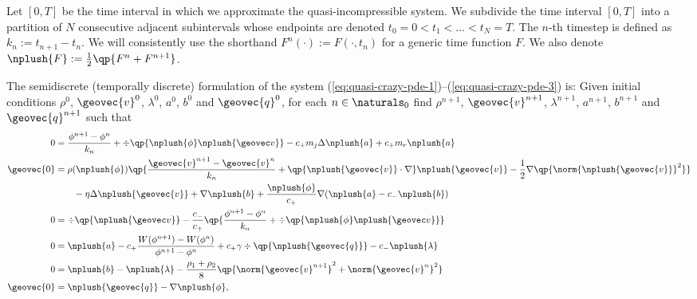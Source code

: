 \documentclass[final]{amsart}
\numberwithin{equation}{section}
\begin{document}
Let $[0,T]$ be the time interval in which we approximate the
quasi-incompressible system. We subdivide the time interval $[0,T]$
into a partition of $N$ consecutive adjacent subintervals whose
endpoints are denoted $t_0=0<t_1<\ldots<t_{N}=T$.  The $n$-th timestep
is defined as ${k_n := t_{n+1} - t_{n}}$.  We will consistently use
the shorthand $F^n(\cdot):=F(\cdot,t_n)$ for a generic time function
$F$. We also denote $\nplush{F} := \frac{1}{2}\qp{F^n + F^{n+1}}$.

The semidiscrete (temporally discrete) formulation of the system
(\ref{eq:quasi-crazy-pde-1})--(\ref{eq:quasi-crazy-pde-3}) is: Given
initial conditions $\rho^0$, ${\geovec{v}}^0$, $\lambda^0$, $a^0$, $b^0$ and
${\geovec{q}}^0$, for each
{$n\in\naturals_{0}$} find
$\rho^{n+1}$, ${\geovec{v}}^{n+1}$, $\lambda^{n+1}$, $a^{n+1}$, $b^{n+1}$
and ${\geovec{q}}^{n+1}$ such that
\begin{equation}
  \label{eq:temporally-discrete}
  \begin{split}
    0
    &= 
    \frac{\phi^{n+1} - \phi^n}{k_n} 
    +
    \div\qp{\nplush{\phi} \nplush{\geovec v}}
    -
    c_+ m_j \Delta \nplush{a}
    +
    c_+ m_r \nplush{a}
    \\
   {\geovec{0}} 
    &= 
    \rho(\nplush{\phi})
    \qp{
      \frac{{\geovec{{v}}}^{n+1} - {\geovec{{v}}}^n}{k_n}
      +
      \qp{\nplush{{\geovec{{v}}}}\cdot \nabla}\nplush{{\geovec{{v}}}}
      -
      \frac{1}{2}
      \nabla\qp{\norm{\nplush{{\geovec{{v}}}}}^2}
    }
    \\
    &\qquad - 
    \eta \Delta \nplush{\geovec{v}}
    +
    \nabla \nplush{b}
    +
    \frac{\nplush{\phi}}{c_+}\nabla( \nplush{a} - {c_-} \nplush{b})
    \\
    0 
    &= 
    \div\qp{\nplush{\geovec v}}
    -
    \frac{c_-}{c_+}
    \qp{
      \frac{\phi^{n+1} - \phi^n}{k_n}
      +
      \div\qp{\nplush{\phi}\nplush{\geovec v}}
    }
    \\
    0
    &=
    \nplush{a}
    - 
    c_+\frac{W(\phi^{n+1}) - W(\phi^n)}{\phi^{n+1}-\phi^n}
    +
    c_+\gamma\div\qp{\nplush{{\geovec{{q}}}}}
    -
    c_-\nplush{\lambda}
    \\
    0&= 
    \nplush{b}
    -
    \nplush{\lambda}
    -
    \frac{\rho_1+\rho_2}{8}
    \qp{\norm{\geovec{v}^{n+1}}^2 + \norm{\geovec{v}^{n}}^2}
    \\
    {\geovec{0}} 
    &=
    {\nplush{{\geovec{q}}}} 
    -
    \nabla \nplush{\phi},
  \end{split}
\end{equation}
\end{document}
